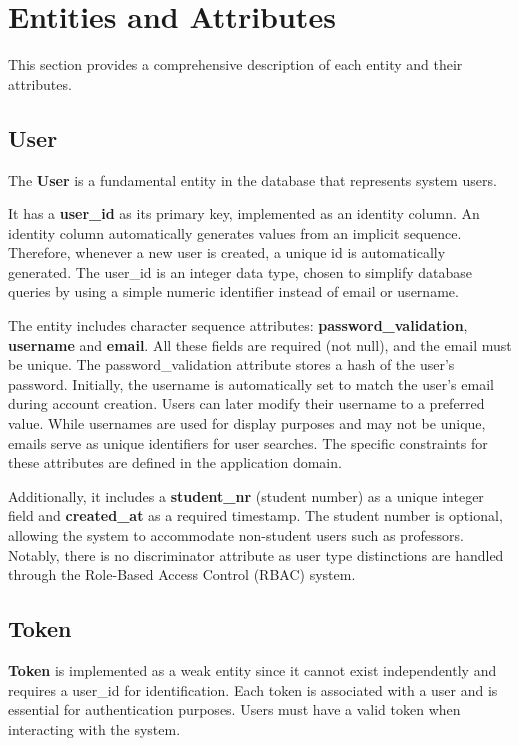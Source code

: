 \documentclass[a4paper,twoside,11pt]{article}
\begin{document}
\section{Entities and Attributes}
This section provides a comprehensive description of each entity and their attributes.
\subsection{User}
The \textbf{User} is a fundamental entity in the database that represents system users.

It has a \textbf{user\_id} as its primary key, implemented as an identity column. An identity column automatically generates values from an implicit sequence.
Therefore, whenever a new user is created, a unique id is automatically generated. The user\_id is an integer data type, chosen to simplify database queries by using a simple numeric identifier instead of email or username.

The entity includes character sequence attributes: \textbf{password\_validation}, \textbf{username} and \textbf{email}. All these fields are required (not null), and the email must be unique. The password\_validation attribute stores a hash of the user's password.
Initially, the username is automatically set to match the user's email during account creation. Users can later modify their username to a preferred value. While usernames are used for display purposes and may not be unique, emails serve as unique identifiers for user searches. The specific constraints for these attributes are defined in the application domain.

Additionally, it includes a \textbf{student\_nr} (student number) as a unique integer field and \textbf{created\_at} as a required timestamp.
The student number is optional, allowing the system to accommodate non-student users such as professors. Notably, there is no discriminator attribute as user type distinctions are handled through the Role-Based Access Control (RBAC) system.

\subsection{Token}
\textbf{Token} is implemented as a weak entity since it cannot exist independently and requires a user\_id for identification. Each token is associated with a user and is essential for authentication purposes. Users must have a valid token when interacting with the system.
\end{document}
